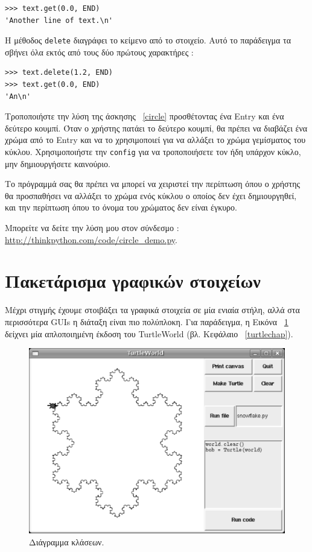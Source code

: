 \documentclass[10pt]{book}
\begin{document}
\begin{verbatim}
>>> text.get(0.0, END)
'Another line of text.\n'
\end{verbatim}
%
 Η μέθοδος  {\tt delete}  διαγράφει το κείμενο από το στοιχείο.  
Αυτό το παράδειγμα τα σβήνει όλα εκτός από τους δύο πρώτους χαρακτήρες :

\begin{verbatim}
>>> text.delete(1.2, END)
>>> text.get(0.0, END)
'An\n'
\end{verbatim}
%

\begin{exercise}
\label{circle2}

Τροποποιήστε την λύση της άσκησης~ \ref{circle}  προσθέτοντας ένα  Entry  
και ένα δεύτερο κουμπί.  Όταν ο χρήστης πατάει το δεύτερο κουμπί, θα πρέπει να διαβάζει 
ένα χρώμα από το  Entry  και να το χρησιμοποιεί για να αλλάξει το χρώμα γεμίσματος 
του κύκλου.  Χρησιμοποιήστε την  {\tt config}  για να τροποποιήσετε τον ήδη υπάρχον 
κύκλο, μην δημιουργήσετε καινούριο.

Το πρόγραμμά σας θα πρέπει να μπορεί να χειριστεί την περίπτωση όπου ο χρήστης θα προσπαθήσει 
να αλλάξει το χρώμα ενός κύκλου ο οποίος δεν έχει δημιουργηθεί, και την περίπτωση όπου το όνομα του χρώματος δεν είναι έγκυρο.

Μπορείτε να δείτε την λύση μου στον σύνδεσμο :
\url{http://thinkpython.com/code/circle_demo.py}.
\end{exercise}


 
\section{Πακετάρισμα γραφικών στοιχείων}

Μέχρι στιγμής έχουμε στοιβάξει τα γραφικά στοιχεία σε μία ενιαία στήλη, αλλά στα περισσότερα 
 GUIs  η διάταξη είναι πιο πολύπλοκη.  Για παράδειγμα, η Εικόνα~ \ref{fig.turtleworld}  δείχνει μία απλοποιημένη έκδοση του  
TurtleWorld  (βλ. Κεφάλαιο~ \ref{turtlechap}).

\begin{figure}
\centerline{\includegraphics[scale=0.5]{figs/TurtleWorld.pdf}}
 \caption{Διάγραμμα κλάσεων.} 
\label{fig.turtleworld}
\end{figure}
\end{document}
